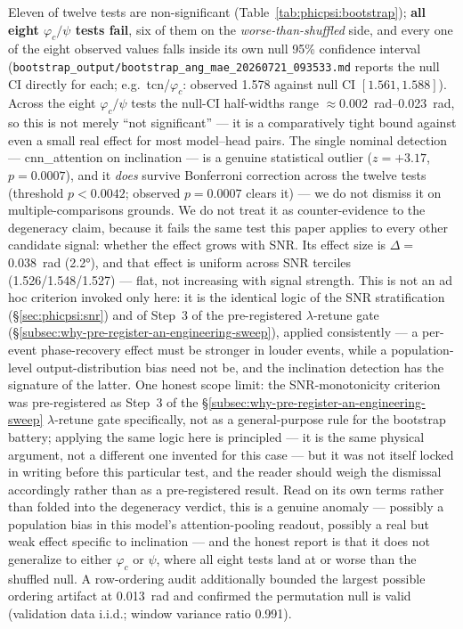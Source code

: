 Eleven of twelve tests are non-significant (Table~\ref{tab:phicpsi:bootstrap}); \textbf{all eight $\varphi_c/\psi$ tests fail}, six of them on the \emph{worse-than-shuffled} side, and every one of the eight observed values falls inside its own null 95\% confidence interval (\texttt{bootstrap\_output/bootstrap\_ang\_mae\_20260721\_093533.md} reports the null CI directly for each; e.g.\ tcn/$\varphi_c$: observed 1.578 against null CI $[1.561, 1.588]$).
Across the eight $\varphi_c/\psi$ tests the null-CI half-widths range ${\approx}{}$\SIrange{0.002}{0.023}{\radian}, so this is not merely ``not significant'' --- it is a comparatively tight bound against even a small real effect for most model--head pairs.
The single nominal detection --- cnn\_attention on inclination --- is a genuine statistical outlier ($z=+3.17$, $p=0.0007$), and it \emph{does} survive Bonferroni correction across the twelve tests (threshold $p < 0.0042$; observed $p = 0.0007$ clears it) --- we do not dismiss it on multiple-comparisons grounds.
We do not treat it as counter-evidence to the degeneracy claim, because it fails the same test this paper applies to every other candidate signal: whether the effect grows with SNR.
Its effect size is $\Delta = {}$\SI{0.038}{\radian} (\ang{2.2}), and that effect is uniform across SNR terciles (1.526/1.548/1.527) --- flat, not increasing with signal strength.
This is not an ad hoc criterion invoked only here: it is the identical logic of the SNR stratification (\S\ref{sec:phicpsi:snr}) and of Step~3 of the pre-registered $\lambda$-retune gate (\S\ref{subsec:why-pre-register-an-engineering-sweep}), applied consistently --- a per-event phase-recovery effect must be stronger in louder events, while a population-level output-distribution bias need not be, and the inclination detection has the signature of the latter.
One honest scope limit: the SNR-monotonicity criterion was pre-registered as Step~3 of the \S\ref{subsec:why-pre-register-an-engineering-sweep} $\lambda$-retune gate specifically, not as a general-purpose rule for the bootstrap battery; applying the same logic here is principled --- it is the same physical argument, not a different one invented for this case --- but it was not itself locked in writing before this particular test, and the reader should weigh the dismissal accordingly rather than as a pre-registered result.
Read on its own terms rather than folded into the degeneracy verdict, this is a genuine anomaly --- possibly a population bias in this model's attention-pooling readout, possibly a real but weak effect specific to inclination --- and the honest report is that it does not generalize to either $\varphi_c$ or $\psi$, where all eight tests land at or worse than the shuffled null.
A row-ordering audit additionally bounded the largest possible ordering artifact at \SI{0.013}{\radian} and confirmed the permutation null is valid (validation data i.i.d.; window variance ratio 0.991).

